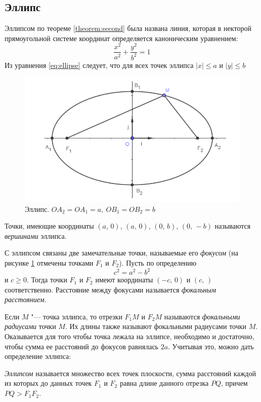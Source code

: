 \subsection*{Эллипс}
Эллипсом по теореме \ref{theorem:second} была названа линия, которая в некторой прямоугольной системе координат определяется каноническим уравнением:
\begin{equation}
  \label{eq:ellipse}
  \frac{x^2}{a^2} + \frac{y^2}{b^2} = 1
\end{equation}
Из уравнения \ref{eq:ellipse} следует, что для всех точек эллипса $\mathopen|x\mathclose| \leq a$ и $\mathopen|y\mathclose| \leq b$
\begin{figure}[H]
  \centering
  \includegraphics[width = \textwidth]{images/second_ellipse.png}
  \caption{Эллипс. $OA_2 = OA_1 = a, ~ OB_1 = OB_2 = b$}
  \label{fig:ellipse} 
\end{figure}

Точки, имеющие координаты $(a,\, 0), \, (a,\, 0), \, (0,\, b), \, (0,\, -b)$ называются \textit{вершинами} эллипса.

С эллипсом связаны две замечательные точки, называемые его \textit{фокусом} (на рисунке \ref{fig:ellipse} отмечены точками $F_1$ и $F_2$). Пусть по определению 
$$
  c^2 = a^2 - b^2
$$
и $c \geq 0$. Тогда точки $F_1$ и $F_2$ имеют координаты $(-c,\, 0)$ и $(c, \, )$ соответственно. Расстояние между фокусами называется \textit{фокальным расстоянием}.

Если $M$ "--- точка эллипса, то отрезки $F_1M$ и $F_2M$ называются \textit{фокальными радиусами} точки $M$. Их длины также называют фокальными радиусами точки $M$. Оказывается для того чтобы точка лежала на эллипсе, необходимо и достаточно, чтобы сумма ее расстояний до фокусов равнялась $2a$. Учитывая это, можно дать определение эллипса:
\begin{definition}
  \textit{Эллипсом} называется множество всех точек плоскости, сумма расстояний каждой из которых до данных точек $F_1$ и $F_2$ равна длине данного отрезка $PQ$, причем $PQ > F_1F_2$.
\end{definition}

